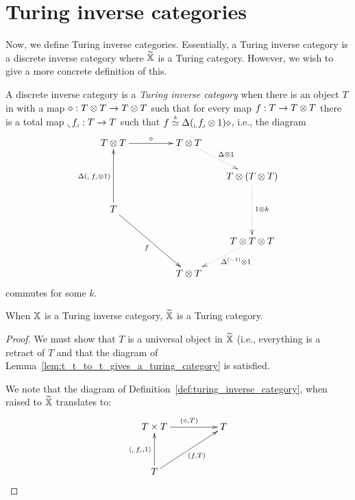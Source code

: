 \section{Turing inverse categories}
\label{sec:turing_inverse_categories}
Now, we define Turing inverse categories. Essentially, a Turing inverse category is a discrete
inverse category \X where $\widetilde{\mathbb{X}}$ is a Turing category. However, we wish to give a more concrete
definition of this.

\begin{definition}\label{def:turing_inverse_category}
  A discrete inverse category \X is a \emph{Turing inverse category} when there is an object $T$ in
  \X with a map $\diamond :T\otimes T \to T\otimes T$ such that for every map $f:T \to T\otimes T$ there is a total map
  ${}_\llcorner f_{\!\lrcorner}: T\to T$ such that $f \overset{\scriptscriptstyle k}{\simeq} \Delta({}_\llcorner f_{\!\lrcorner}\otimes1)\diamond$, i.e., the diagram
  \[
    \xymatrix @C=20pt @R=20pt{
      T\*T \ar[rr]^{\diamond} & & T \* T \ar@{.>}[dr]^{\Delta\* 1}\\
      & & & T \* (T\* T) \ar@{.>}[dd]^{1\*k}\\
      T \ar[uu]^{\Delta(\icode{f}\*1)} \ar[ddrr]_{f} \\
      & & & T \* T\*T \ar@{.>}[dl]^(.4){\inv{\Delta}\* 1}\\
      && T\*T
    }
  \]
  commutes for some $k$.
\end{definition}

\begin{lemma}\label{lem:turing_inverse_category_gives_a_turing_category}
  When $\mathbb{X}$ is a Turing inverse category, $\widetilde{\mathbb{X}}$ is a Turing category.
\end{lemma}
\begin{proof}
  We must show that $T$ is a universal object in $\widetilde{\mathbb{X}}$ (i.e., everything is a retract of $T$ and
  that the diagram of Lemma~\ref{lem:t_t_to_t_gives_a_turing_category} is satisfied.

  We note that the diagram of Definition~\ref{def:turing_inverse_category}, when raised to $\widetilde{\mathbb{X}}$
  translates to:
  \[
    \xymatrix@C+25pt@R+10pt{
      T \times T \ar[r]^{(\diamond, T)} &T \\
      T \ar[u]^{\<\icode{f},1\>} \ar[ur]_{(f, T)}
    }
  \]

\end{proof}

